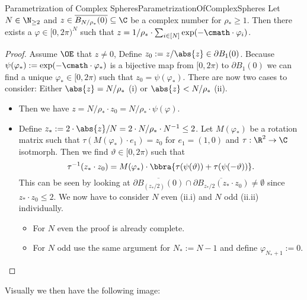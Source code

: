 \begin{mlem}{Parametrization of Complex Spheres}{ParametrizationOfComplexSpheres}
    Let $N\in\N_{\geq 2}$ and $z\in \overline{B_{N/\rho_*}(0)}\subseteq\C$ be a complex number for $\rho_*\geq 1$. Then there exists a $\varphi\in[0,2\pi)^N$ such that $z = 1/\rho_*\cdot \sum_{i\in[N]}\exp(-\cmath\cdot \varphi_i)$.
\end{mlem}
\begin{proof}
    Assume $\OE$ that $z\neq 0$, Define $z_0:=z/\abs{z}\in \partial B_1(0)$. Because $\psi(\varphi_*):=\exp(-\cmath\cdot \varphi_*)$ is a bijective map from $[0,2\pi)$ to $\partial B_1(0)$ we can find a unique $\varphi_*\in[0,2\pi)$ such that $z_0 = \psi(\varphi_*)$. There are now two cases to consider: Either $\abs{z} = N/\rho_*$ (i) or $\abs{z} < N/\rho_*$ (ii).
    \begin{itemize}
        \item[(i)] Then we have $z = N/\rho_*\cdot z_0 = N/\rho_*\cdot \psi(\varphi)$.
        \item[(ii)] Define $z_* := 2\cdot \abs{z} / N = 2\cdot N/\rho_*\cdot N^{-1} \leq 2$. Let $M(\varphi_*)$ be a rotation matrix such that $\tau(M(\varphi_*)\cdot e_1) = z_0$ for $e_1 = (1,0)$ and $\tau:\R^2\to\C$ isotmorph. Then we find $\vartheta\in[0,2\pi)$ such that
        \[
            \tau^{-1}(z_*\cdot z_0) = M(\varphi_*)\cdot \bbra{
            \tau(\psi(\vartheta)) + \tau(\psi(-\vartheta))
            }.
        \] 
        This can be seen by looking at $\overline{\partial B_(z_*/2)(0)} \cap \overline{\partial B_{z_*/2}(z_*\cdot z_0)} \neq \emptyset$ since $z_*\cdot z_0\leq 2$. We now have to consider $N$ even (ii.i) and $N$ odd (ii.ii) individually.
        \begin{itemize}
            \item[(ii.i)] For $N$ even the proof is already complete.
            \item[(ii.ii)] For $N$ odd use the same argument for $N_*:=N-1$ and define $\varphi_{N_* + 1}:= 0$.
        \end{itemize}
    \end{itemize}
\end{proof}
Visually we then have the following image:

